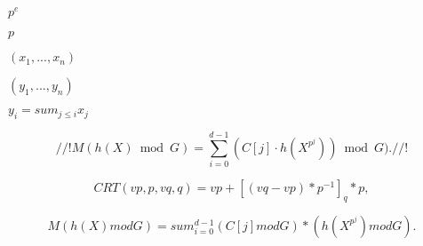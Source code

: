 \documentclass{article}
\begin{document}
$p^e$
\pagebreak

$p$
\pagebreak

$(x_1, ..., x_n)$
\pagebreak

$(y_1, ..., y_n)$
\pagebreak

$y_i = sum_{j\le i} x_j$
\pagebreak

\[ //! M(h(X) \bmod G)= \sum_{i=0}^{d-1}(C[j] \cdot h(X^{p^j}))\bmod G). //! \]
\pagebreak

\[ CRT(vp,p,vq,q) = vp + [(vq-vp) * p^{-1}]_q * p, \]
\pagebreak

\[ M(h(X) mod G) = sum_{i=0}^{d-1} (C[j] mod G) * (h(X^{p^j}) mod G).\]
\pagebreak
\end{document}
